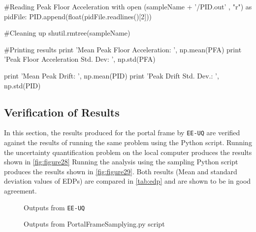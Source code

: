 \begin{python}[caption=Python script for analyzing the portal frame model with uncertain parameters]
        #Reading Peak Floor Acceleration
        with open (sampleName + '/PID.out' , "r") as pidFile:
            PID.append(float(pidFile.readlines()[2]))

        #Cleaning up
        shutil.rmtree(sampleName)

#Printing results
print 'Mean Peak Floor Acceleration: ', np.mean(PFA)
print 'Peak Floor Acceleration Std. Dev: ', np.std(PFA)

print 'Mean Peak Drift: ', np.mean(PID)
print 'Peak Drift Std. Dev.: ', np.std(PID)
\end{python}

\subsection{Verification of Results}
In this section, the results produced for the portal frame
by \texttt{EE-UQ} are verified against the results of running the same
problem using the Python script.  Running the uncertainty
quantification problem on the local computer produces the results
shown in \autoref{fig:figure28} Running the analysis using the
sampling Python script produces the results shown
in \autoref{fig:figure29}.  Both results (Mean and standard deviation
values of EDPs) are compared in \autoref{tab:edp} and are shown to be in good
agreement.

\begin{figure}[!htbp]
  \caption{Outputs from \texttt{EE-UQ}}
  \label{fig:figure28}
\end{figure}


\begin{figure}[!htbp]
  \caption{Outputs from PortalFrameSamplying.py script}
  \label{fig:figure29}
\end{figure}

